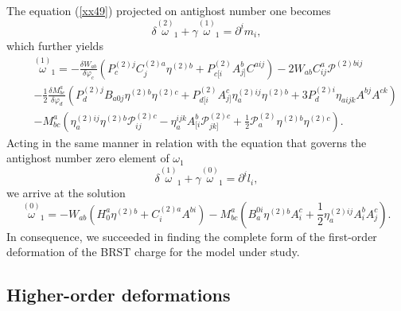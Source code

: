 \documentclass[a4paper,12pt]{article}
\begin{document}
The equation (\ref{xx49}) projected on antighost number one becomes 
\begin{equation}
\delta \stackrel{(2)}{\omega }_{1}+\gamma \stackrel{(1)}{\omega }%
_{1}=\partial ^{i}m_{i},  \label{xx62}
\end{equation}
which further yields 
\begin{eqnarray}
&&\stackrel{(1)}{\omega }_{1}=-\frac{\delta W_{ab}}{\delta \varphi _{c}}%
\left( P_{c}^{(2)j}C_{j}^{(2)a}\eta
^{(2)b}+P_{c[i}^{(2)}A_{j]}^{b}C^{aij}\right) -2W_{ab}C_{ij}^{a}\mathcal{P}%
^{(2)bij}  \nonumber \\
&&-\frac{1}{2}\frac{\delta M_{bc}^{a}}{\delta \varphi _{d}}\left(
P_{d}^{(2)j}B_{a0j}\eta ^{(2)b}\eta ^{(2)c}+P_{d[i}^{(2)}A_{j]}^{c}\eta
_{a}^{(2)ij}\eta ^{(2)b}+3P_{d}^{(2)i}\eta _{aijk}A^{bj}A^{ck}\right)  
\nonumber \\
&&-M_{bc}^{a}\left( \eta _{a}^{(2)ij}\eta ^{(2)b}\mathcal{P}%
_{ij}^{(2)c}-\eta _{a}^{ijk}A_{[i}^{b}\mathcal{P}_{jk]}^{(2)c}+\frac{1}{2}%
\mathcal{P}_{a}^{(2)}\eta ^{(2)b}\eta ^{(2)c}\right) .  \label{xx63}
\end{eqnarray}
Acting in the same manner in relation with the equation that governs the
antighost number zero element of $\omega _{1}$%
\begin{equation}
\delta \stackrel{(1)}{\omega }_{1}+\gamma \stackrel{(0)}{\omega }%
_{1}=\partial ^{i}l_{i},  \label{xx64}
\end{equation}
we arrive at the solution 
\begin{equation}
\stackrel{(0)}{\omega }_{1}=-W_{ab}\left( H_{0}^{a}\eta
^{(2)b}+C_{i}^{(2)a}A^{bi}\right) -M_{bc}^{a}\left( B_{a}^{0i}\eta
^{(2)b}A_{i}^{c}+\frac{1}{2}\eta _{a}^{(2)ij}A_{i}^{b}A_{j}^{c}\right) .
\label{xx65}
\end{equation}
In consequence, we succeeded in finding the complete form of the first-order
deformation of the BRST charge for the model under study.

\subsection{Higher-order deformations}
\end{document}
